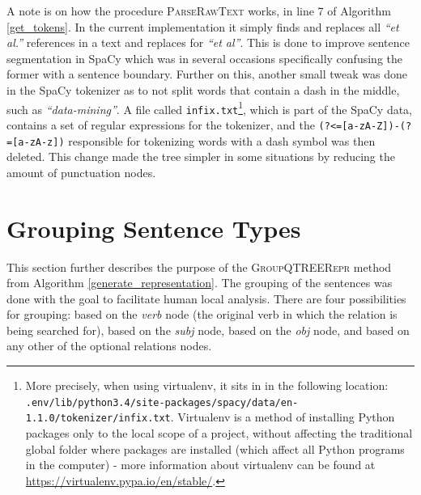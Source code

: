 \documentclass[11pt,a4paper,openright]{memoir}
\begin{document}
A note is on how the procedure \textsc{ParseRawText} works, in line 7 of Algorithm \ref{get_tokens}. In the current implementation it simply finds and replaces all \emph{\enquote{et al.}} references in a text and replaces for \emph{\enquote{et al}}. This is done to improve sentence segmentation in SpaCy which was in several occasions specifically confusing the former with a sentence boundary. Further on this, another small tweak was done in the SpaCy tokenizer as to not split words that contain a dash in the middle, such as \emph{\enquote{data-mining}}. A file called \texttt{infix.txt}\footnote{More precisely, when using virtualenv, it sits in in the following location: \texttt{.env/lib/python3.4/site-packages/spacy/data/en-1.1.0/tokenizer/infix.txt}. Virtualenv is a method of installing Python packages only to the local scope of a project, without affecting the traditional global folder where packages are installed (which affect all Python programs in the computer) - more information about virtualenv can be found at \url{https://virtualenv.pypa.io/en/stable/}.}, which is part of the SpaCy data, contains a set of regular expressions for the tokenizer, and the \texttt{(?<=[a-zA-Z])-(?=[a-zA-z])} responsible for tokenizing words with a dash symbol was then deleted. This change made the tree simpler in some situations by reducing the amount of punctuation nodes.



%
%
%
%

\section{Grouping Sentence Types}
\label{section:grouping}

This section further describes the purpose of the \textsc{GroupQTREERepr} method from Algorithm \ref{generate_representation}. The grouping of the sentences was done with the goal to facilitate human local analysis. There are four possibilities for grouping: based on the \emph{verb} node (the original verb in which the relation is being searched for), based on the \emph{subj} node, based on the \emph{obj} node, and based on any other of the optional relations nodes.
\end{document}
